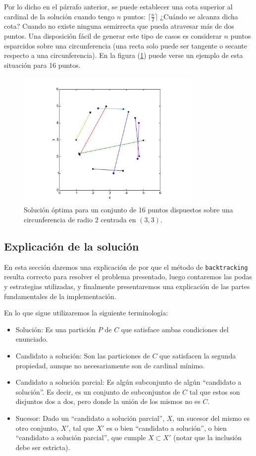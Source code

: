 Por lo dicho en el párrafo anterior, se puede establecer una cota superior al cardinal de la solución cuando tengo $n$ puntos: $\lceil\frac{n}{2}\rceil$ ¿Cuándo se alcanza dicha cota? Cuando no existe ninguna semirrecta que pueda atravesar más de dos puntos. Una disposición fácil de generar este tipo de casos es considerar $n$ puntos esparcidos sobre una circunferencia (una recta solo puede ser tangente o secante respecto a una circunferencia). En la figura (\ref{fig:ej3-5}) puede verse un ejemplo de esta situación para 16 puntos.

\begin{figure}[H]
  \centering
  \includegraphics[width=0.80\textwidth]{img/ejemplos/ej3-5.pdf}
  \caption{\footnotesize Solución óptima para un conjunto de 16 puntos dispuestos sobre una circunferencia de radio 2 centrada en $(3,3)$.}
  \label{fig:ej3-5}
\end{figure}

\subsection{Explicación de la solución}
En esta sección daremos una explicación de por que el método de \texttt{backtracking} resulta correcto para resolver el problema presentado,  luego contaremos las podas y estrategias utilizadas, y finalmente presentaremos una explicación de las partes fundamentales de la implementación. 

En lo que sigue utilizaremos la siguiente terminología:
\begin{itemize}
  \item Solución: Es una partición $P$ de $C$ que satisface ambas condiciones del enunciado.
  \item Candidato a solución: Son las particiones de $C$ que satisfacen la segunda propiedad, aunque no necesariamente son de cardinal mínimo.
  \item Candidato a solución parcial: Es algún subconjunto de algún ``candidato a solución''. Es decir, es un conjunto de subconjuntos de $C$ tal que estos son disjuntos dos a dos, pero donde la unión de los mismos no es $C$.
  \item Sucesor: Dado un ``candidato a solución parcial'', $X$, un sucesor del mismo es otro conjunto, $X'$, tal que $X'$ es o bien ``candidato a solución'', o bien ``candidato a solución parcial'', que cumple $X \subset X'$ (notar que la inclusión debe ser estricta).
\end{itemize}

